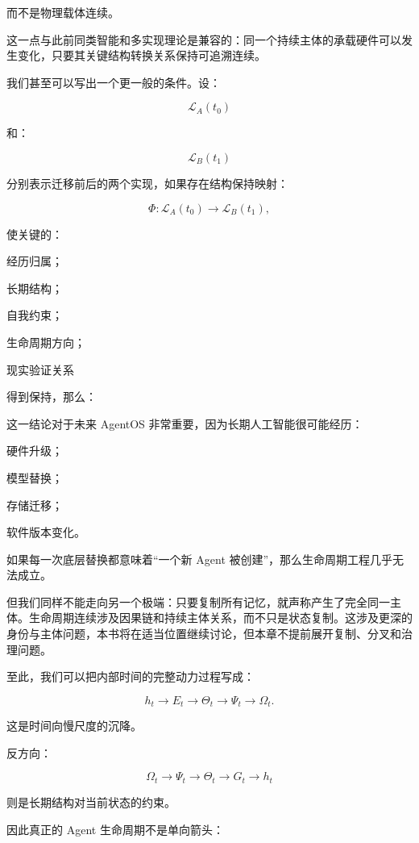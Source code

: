 而不是物理载体连续。

这一点与此前同类智能和多实现理论是兼容的：同一个持续主体的承载硬件可以发生变化，只要其关键结构转换关系保持可追溯连续。

我们甚至可以写出一个更一般的条件。设：

\[
\mathcal{L}_A(t_0)
\]

和：

\[
\mathcal{L}_B(t_1)
\]

分别表示迁移前后的两个实现，如果存在结构保持映射：

\[
\Phi:
\mathcal{L}_A(t_0)
\rightarrow
\mathcal{L}_B(t_1),
\]

使关键的：

经历归属；

长期结构；

自我约束；

生命周期方向；

现实验证关系

得到保持，那么：

\begin{statementbox}
\centering
{}
\end{statementbox}

这一结论对于未来 AgentOS 非常重要，因为长期人工智能很可能经历：

硬件升级；

模型替换；

存储迁移；

软件版本变化。

如果每一次底层替换都意味着“一个新 Agent 被创建”，那么生命周期工程几乎无法成立。

但我们同样不能走向另一个极端：只要复制所有记忆，就声称产生了完全同一主体。生命周期连续涉及因果链和持续主体关系，而不只是状态复制。这涉及更深的身份与主体问题，本书将在适当位置继续讨论，但本章不提前展开复制、分叉和治理问题。

至此，我们可以把内部时间的完整动力过程写成：

\[
h_t
\rightarrow
E_t
\rightarrow
\Theta_t
\rightarrow
\Psi_t
\rightarrow
\Omega_t.
\]

这是时间向慢尺度的沉降。

反方向：

\[
\Omega_t
\rightarrow
\Psi_t
\rightarrow
\Theta_t
\rightarrow
G_t
\rightarrow
h_t
\]

则是长期结构对当前状态的约束。

因此真正的 Agent 生命周期不是单向箭头：

